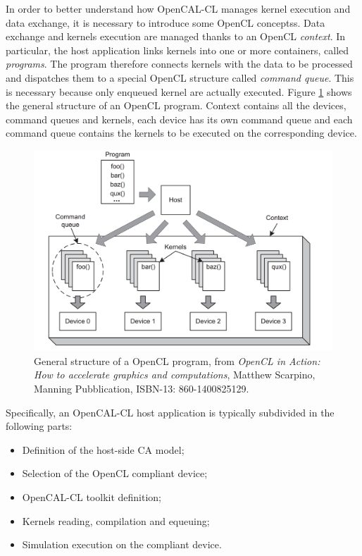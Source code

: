 In order to better understand how OpenCAL-CL manages kernel execution
and data exchange, it is necessary to introduce some OpenCL
conceptss. Data exchange and kernels execution are managed thanks to
an OpenCL \emph{context}. In particular, the host application links
kernels into one or more containers, called \emph{programs}. The
program therefore connects kernels with the data to be processed and
dispatches them to a special OpenCL structure called \emph{command
  queue}. This is necessary because only enqueued kernel are actually
executed. Figure \ref{fig:GeneralStructure} shows the general
structure of an OpenCL program. Context contains all the devices,
command queues and kernels, each device has its own command queue and
each command queue contains the kernels to be executed on the
corresponding device.

\begin{figure}[htp]
  \begin{center}
    \includegraphics[width=12cm]{./images/OpenCAL-CL/kernelDistribution}
    \caption{General structure of a OpenCL program, from \emph{OpenCL
        in Action: How to accelerate graphics and computations},
      Matthew Scarpino, Manning Pubblication, ISBN-13:
      860-1400825129.}
    \label{fig:GeneralStructure}
  \end{center}
\end{figure}

Specifically, an OpenCAL-CL host application is typically
subdivided in the following parts:
\begin{itemize}
\item Definition of the host-side CA model;
\item Selection of the OpenCL compliant device;
\item OpenCAL-CL toolkit definition;
\item Kernels reading, compilation and equeuing;
\item Simulation execution on the compliant device.
\end{itemize}

